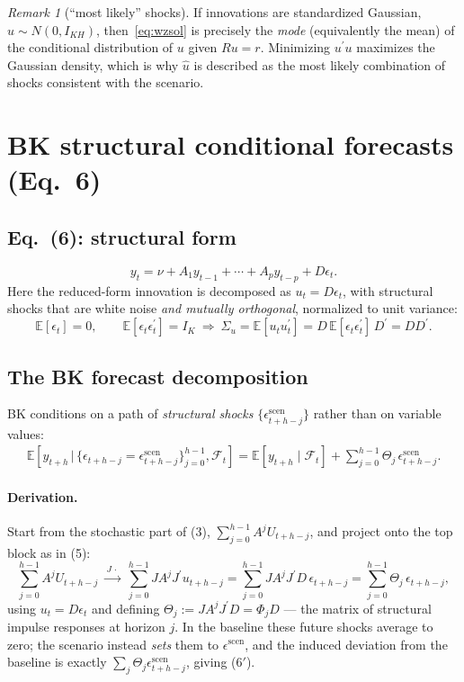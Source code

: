\documentclass[11pt]{article}
\newcommand{\E}{\mathbb{E}}
\newcommand{\Fset}{\mathcal{F}}
\newcommand{\tp}{^{\prime}}
\theoremstyle{remark}
\newtheorem{remark}{Remark}
\begin{document}
\begin{remark}[``most likely'' shocks]
If innovations are standardized Gaussian, $u\sim N(0,I_{KH})$, then~\eqref{eq:wzsol}
is precisely the \emph{mode} (equivalently the mean) of the conditional
distribution of $u$ given $Ru=r$. Minimizing $u\tp u$ maximizes the Gaussian
density, which is why $\hat u$ is described as the most likely combination of
shocks consistent with the scenario.
\end{remark}

\section{BK structural conditional forecasts (Eq.~6)}
\subsection*{Eq.~(6): structural form}
\begin{equation}
y_t=\nu+A_1y_{t-1}+\cdots+A_py_{t-p}+D\epsilon_t. \tag{6}
\end{equation}
Here the reduced-form innovation is decomposed as $u_t=D\epsilon_t$, with
structural shocks that are white noise \emph{and mutually orthogonal},
normalized to unit variance:
\[
\E[\epsilon_t]=0,\qquad \E[\epsilon_t\epsilon_t\tp]=I_K
\ \Rightarrow\ \Sigma_u=\E[u_tu_t\tp]=D\,\E[\epsilon_t\epsilon_t\tp]\,D\tp=DD\tp.
\]

\subsection*{The BK forecast decomposition}
BK conditions on a path of \emph{structural shocks}
$\{\epsilon^{\text{scen}}_{t+h-j}\}$ rather than on variable values:
\begin{multline}
\E\!\left[y_{t+h}\,\Big|\,\{\epsilon_{t+h-j}=\epsilon^{\text{scen}}_{t+h-j}\}_{j=0}^{h-1},\Fset_t\right]
=\E\!\left[y_{t+h}\mid\Fset_t\right]
+\sum_{j=0}^{h-1}\Theta_j\,\epsilon^{\text{scen}}_{t+h-j}. \tag{6$'$}
\end{multline}

\paragraph{Derivation.} Start from the stochastic part of (3),
$\sum_{j=0}^{h-1}A^{j}U_{t+h-j}$, and project onto the top block as in (5):
\[
\sum_{j=0}^{h-1}A^{j}U_{t+h-j}
\ \xrightarrow{\ J\,\cdot\ }\
\sum_{j=0}^{h-1}JA^{j}J\tp u_{t+h-j}
=\sum_{j=0}^{h-1}JA^{j}J\tp D\,\epsilon_{t+h-j}
=\sum_{j=0}^{h-1}\Theta_j\,\epsilon_{t+h-j},
\]
using $u_t=D\epsilon_t$ and defining $\Theta_j:=JA^{j}J\tp D=\Phi_jD$ — the
matrix of structural impulse responses at horizon $j$. In the baseline these
future shocks average to zero; the scenario instead \emph{sets} them to
$\epsilon^{\text{scen}}$, and the induced deviation from the baseline is exactly
$\sum_{j}\Theta_j\epsilon^{\text{scen}}_{t+h-j}$, giving (6$'$).
\end{document}

